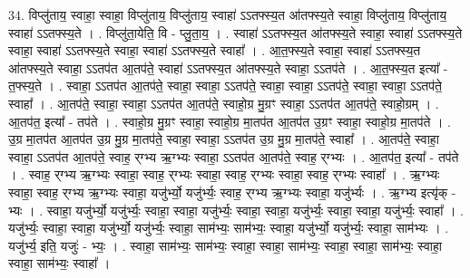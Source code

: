 \documentclass[17pt]{extarticle}
\begin{document}
34. विप्लु॑ताय॒ स्वाहा॒ स्वाहा॒ विप्लु॑ताय॒ विप्लु॑ताय॒ स्वाहा॑ ऽऽतफ्स्य॒त आ॑तफ्स्य॒ते स्वाहा॒ विप्लु॑ताय॒ विप्लु॑ताय॒ स्वाहा॑ ऽऽतफ्स्य॒ते । . विप्लु॑ता॒येति॒ वि - प्लु॒ता॒य॒ । . स्वाहा॑ ऽऽतफ्स्य॒त आ॑तफ्स्य॒ते स्वाहा॒ स्वाहा॑ ऽऽतफ्स्य॒ते स्वाहा॒ स्वाहा॑ ऽऽतफ्स्य॒ते स्वाहा॒ स्वाहा॑ ऽऽतफ्स्य॒ते स्वाहा᳚ । . आ॒त॒फ्स्य॒ते स्वाहा॒ स्वाहा॑ ऽऽतफ्स्य॒त आ॑तफ्स्य॒ते स्वाहा॒ ऽऽतप॑त आ॒तप॑ते॒ स्वाहा॑ ऽऽतफ्स्य॒त आ॑तफ्स्य॒ते स्वाहा॒ ऽऽतप॑ते । . आ॒त॒फ्स्य॒त इत्या᳚ - त॒फ्स्य॒ते । . स्वाहा॒ ऽऽतप॑त आ॒तप॑ते॒ स्वाहा॒ स्वाहा॒ ऽऽतप॑ते॒ स्वाहा॒ स्वाहा॒ ऽऽतप॑ते॒ स्वाहा॒ स्वाहा॒ ऽऽतप॑ते॒ स्वाहा᳚ । . आ॒तप॑ते॒ स्वाहा॒ स्वाहा॒ ऽऽतप॑त आ॒तप॑ते॒ स्वाहो॒ग्र मु॒ग्रꣳ स्वाहा॒ ऽऽतप॑त आ॒तप॑ते॒ स्वाहो॒ग्रम् । . आ॒तप॑त॒ इत्या᳚ - तप॑ते । . स्वाहो॒ग्र मु॒ग्रꣳ स्वाहा॒ स्वाहो॒ग्र मा॒तप॑त आ॒तप॑त उ॒ग्रꣳ स्वाहा॒ स्वाहो॒ग्र मा॒तप॑ते । . उ॒ग्र मा॒तप॑त आ॒तप॑त उ॒ग्र मु॒ग्र मा॒तप॑ते॒ स्वाहा॒ स्वाहा॒ ऽऽतप॑त उ॒ग्र मु॒ग्र मा॒तप॑ते॒ स्वाहा᳚ । . आ॒तप॑ते॒ स्वाहा॒ स्वाहा॒ ऽऽतप॑त आ॒तप॑ते॒ स्वाह॒ र्‌ग्भ्य ऋ॒ग्भ्यः स्वाहा॒ ऽऽतप॑त आ॒तप॑ते॒ स्वाह॒ र्‌ग्भ्यः । . आ॒तप॑त॒ इत्या᳚ - तप॑ते । . स्वाह॒ र्‌ग्भ्य ऋ॒ग्भ्यः स्वाहा॒ स्वाह॒ र्‌ग्भ्यः स्वाहा॒ स्वाह॒ र्‌ग्भ्यः स्वाहा॒ स्वाह॒ र्‌ग्भ्यः स्वाहा᳚ । . ऋ॒ग्भ्यः स्वाहा॒ स्वाह॒ र्‌ग्भ्य ऋ॒ग्भ्यः स्वाहा॒ यजु॑र्भ्यो॒ यजु॑र्भ्यः॒ स्वाह॒ र्‌ग्भ्य ऋ॒ग्भ्यः स्वाहा॒ यजु॑र्भ्यः । . ऋ॒ग्भ्य इत्यृ॑क् - भ्यः । . स्वाहा॒ यजु॑र्भ्यो॒ यजु॑र्भ्यः॒ स्वाहा॒ स्वाहा॒ यजु॑र्भ्यः॒ स्वाहा॒ स्वाहा॒ यजु॑र्भ्यः॒ स्वाहा॒ स्वाहा॒ यजु॑र्भ्यः॒ स्वाहा᳚ । . यजु॑र्भ्यः॒ स्वाहा॒ स्वाहा॒ यजु॑र्भ्यो॒ यजु॑र्भ्यः॒ स्वाहा॒ साम॑भ्यः॒ साम॑भ्यः॒ स्वाहा॒ यजु॑र्भ्यो॒ यजु॑र्भ्यः॒ स्वाहा॒ साम॑भ्यः । . यजु॑र्भ्य॒ इति॒ यजुः॑ - भ्यः॒ । . स्वाहा॒ साम॑भ्यः॒ साम॑भ्यः॒ स्वाहा॒ स्वाहा॒ साम॑भ्यः॒ स्वाहा॒ स्वाहा॒ साम॑भ्यः॒ स्वाहा॒ स्वाहा॒ साम॑भ्यः॒ स्वाहा᳚ । \newline
\end{document}

